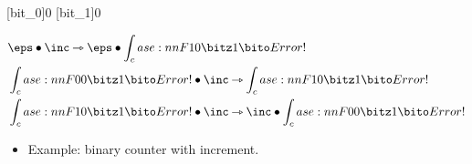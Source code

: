 \NewPredicate{\bitz}[bit_0]{0}
\NewPredicate{\bito}[bit_1]{0}
\ExplSyntaxOn
{}
\ExplSyntaxOff
{}

\begin{align*}
  &\eps \fuse \inc \lrimp \eps \fuse \bit{1} \\
  &\bit{0} \fuse \inc \lrimp \bit{1} \\
  &\bit{1} \fuse \inc \lrimp \inc \fuse \bit{0}
\end{align*}

\begin{itemize}
\item Example: binary counter with increment.
\end{itemize}


